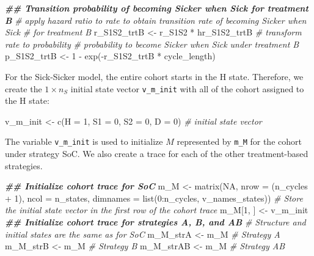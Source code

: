 \documentclass[
]{article}
\newenvironment{Shaded}{\begin{snugshade}}{\end{snugshade}}
\newcommand{\AttributeTok}[1]{\textcolor[rgb]{0.77,0.63,0.00}{#1}}
\newcommand{\CommentTok}[1]{\textcolor[rgb]{0.56,0.35,0.01}{\textit{#1}}}
\newcommand{\ConstantTok}[1]{\textcolor[rgb]{0.00,0.00,0.00}{#1}}
\newcommand{\DecValTok}[1]{\textcolor[rgb]{0.00,0.00,0.81}{#1}}
\newcommand{\DocumentationTok}[1]{\textcolor[rgb]{0.56,0.35,0.01}{\textbf{\textit{#1}}}}
\newcommand{\FunctionTok}[1]{\textcolor[rgb]{0.00,0.00,0.00}{#1}}
\newcommand{\NormalTok}[1]{#1}
\newcommand{\OtherTok}[1]{\textcolor[rgb]{0.56,0.35,0.01}{#1}}
\newcommand{\SpecialCharTok}[1]{\textcolor[rgb]{0.00,0.00,0.00}{#1}}
\begin{document}
\begin{Shaded}
\begin{Highlighting}[]
\DocumentationTok{\#\# Transition probability of becoming Sicker when Sick for treatment B}
\CommentTok{\# apply hazard ratio to rate to obtain transition rate of becoming Sicker when Sick }
\CommentTok{\# for treatment B}
\NormalTok{r\_S1S2\_trtB }\OtherTok{\textless{}{-}}\NormalTok{ r\_S1S2 }\SpecialCharTok{*}\NormalTok{ hr\_S1S2\_trtB}
\CommentTok{\# transform rate to probability}
\CommentTok{\# probability to become Sicker when Sick under treatment B}
\NormalTok{p\_S1S2\_trtB }\OtherTok{\textless{}{-}} \DecValTok{1} \SpecialCharTok{{-}} \FunctionTok{exp}\NormalTok{(}\SpecialCharTok{{-}}\NormalTok{r\_S1S2\_trtB }\SpecialCharTok{*}\NormalTok{ cycle\_length) }
\end{Highlighting}
\end{Shaded}

For the Sick-Sicker model, the entire cohort starts in the H state. Therefore, we create the \(1 \times n_S\) initial state vector \texttt{v\_m\_init} with all of the cohort assigned to the H state:

\begin{Shaded}
\begin{Highlighting}[]
\NormalTok{v\_m\_init }\OtherTok{\textless{}{-}} \FunctionTok{c}\NormalTok{(}\AttributeTok{H =} \DecValTok{1}\NormalTok{, }\AttributeTok{S1 =} \DecValTok{0}\NormalTok{, }\AttributeTok{S2 =} \DecValTok{0}\NormalTok{, }\AttributeTok{D =} \DecValTok{0}\NormalTok{) }\CommentTok{\# initial state vector}
\end{Highlighting}
\end{Shaded}

The variable \texttt{v\_m\_init} is used to initialize \(M\) represented by \texttt{m\_M} for the cohort under strategy SoC. We also create a trace for each of the other treatment-based strategies.

\begin{Shaded}
\begin{Highlighting}[]
\DocumentationTok{\#\# Initialize cohort trace for SoC}
\NormalTok{m\_M }\OtherTok{\textless{}{-}} \FunctionTok{matrix}\NormalTok{(}\ConstantTok{NA}\NormalTok{, }
              \AttributeTok{nrow =}\NormalTok{ (n\_cycles }\SpecialCharTok{+} \DecValTok{1}\NormalTok{), }\AttributeTok{ncol =}\NormalTok{ n\_states, }
              \AttributeTok{dimnames =} \FunctionTok{list}\NormalTok{(}\DecValTok{0}\SpecialCharTok{:}\NormalTok{n\_cycles, v\_names\_states))}
\CommentTok{\# Store the initial state vector in the first row of the cohort trace}
\NormalTok{m\_M[}\DecValTok{1}\NormalTok{, ] }\OtherTok{\textless{}{-}}\NormalTok{ v\_m\_init}
\DocumentationTok{\#\# Initialize cohort trace for strategies A, B, and AB}
\CommentTok{\# Structure and initial states are the same as for SoC}
\NormalTok{m\_M\_strA  }\OtherTok{\textless{}{-}}\NormalTok{ m\_M }\CommentTok{\# Strategy A}
\NormalTok{m\_M\_strB  }\OtherTok{\textless{}{-}}\NormalTok{ m\_M }\CommentTok{\# Strategy B}
\NormalTok{m\_M\_strAB }\OtherTok{\textless{}{-}}\NormalTok{ m\_M }\CommentTok{\# Strategy AB}
\end{Highlighting}
\end{Shaded}
\end{document}
